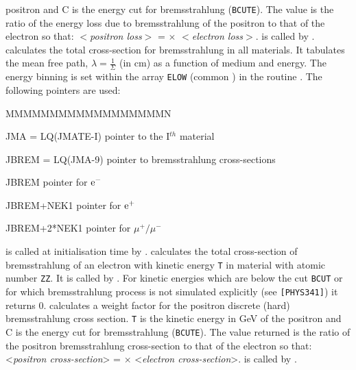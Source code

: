 positron and C is the energy cut for bremsstrahlung ({\tt BCUTE}). The
value is the ratio of the energy loss due to bremsstrahlung of the
positron to that of the electron so that:
$<${\it positron loss}$>$ =  $\times$ $<${\it electron loss}$>$.
 is called by .
 calculates the total cross-section for bremsstrahlung
in all materials. It tabulates the mean free path, $\lambda = 
\frac{1}{\Sigma}$ (in cm) as a function of medium and energy. The energy
binning is set within the array {\tt ELOW} (common ) in the
routine . The following pointers are used:
\begin{DLtt}{MMMMMMMMMMMMMMMMMMN}
\item[JMA = LQ(JMATE-I)]pointer to the I$^{th}$ material
\item[JBREM = LQ(JMA-9)]pointer to bremsstrahlung cross-sections
\item[JBREM            ]pointer for  $\mathrm{e}^-$
\item[JBREM+NEK1       ]pointer for  $\mathrm{e}^+$
\item[JBREM+2*NEK1     ]pointer for $\mu^+/\mu^-$
\end{DLtt}
 is called at initialisation time by .
 calculates the total cross-section of 
bremsstrahlung of an electron with kinetic energy {\tt T} 
in material with atomic number {\tt ZZ}.
It is called by . For kinetic energies 
which are below the cut {\tt BCUT} or
for which bremsstrahlung process is not simulated
explicitly (see {\tt [PHYS341]}) it returns 0.  
 calculates a 
weight factor for the positron discrete (hard) bremsstrahlung cross section.
{\tt T} is the kinetic energy in GeV of the 
positron and C is the energy cut for bremsstrahlung ({\tt BCUTE}). The
value returned is the ratio of the positron bremsstrahlung cross-section
to that of the electron so that:
<{\it positron cross-section}> =  $\times$ <{\it electron 
cross-section}>.   is called by .
